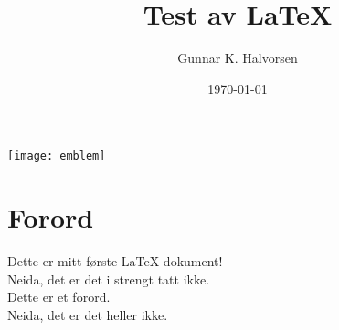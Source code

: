 \documentclass[12pt, a4paper]{article}
\title{Test av \LaTeX{}}
\author{Gunnar K. Halvorsen}
\date{\today}
\begin{document}
\maketitle

\centerline{\texttt{[image: emblem]}}

\clearpage





\section{Forord}
Dette er mitt første \LaTeX{}-dokument! \\
Neida, det er det i strengt tatt ikke. \\

Dette er et forord. \\
Neida, det er det heller ikke.



\end{document}
